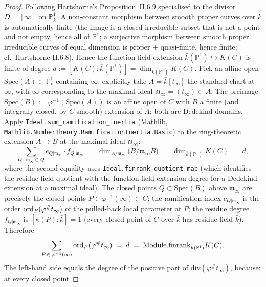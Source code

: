 \begin{proof}
  Following Hartshorne's Proposition~II.6.9 specialised to the divisor
  \(D = [\infty]\) on \(\mathbb P^1_{\bar k}\). A non-constant morphism
  between smooth proper curves over \(\bar k\) is automatically finite (the
  image is a closed irreducible subset that is not a point and not empty,
  hence all of \(\mathbb P^1\); a surjective morphism between smooth proper
  irreducible curves of equal dimension is proper + quasi-finite, hence
  finite; cf.\ Hartshorne II.6.8). Hence the function-field extension
  \(\bar k(\mathbb P^1) \hookrightarrow K(C)\) is finite of degree
  \(d := [K(C) : \bar k(\mathbb P^1)] = \dim_{\bar k(\mathbb P^1)} K(C)\).
  Pick an affine open \(\mathrm{Spec}(A) \subset \mathbb P^1_{\bar k}\) containing
  \(\infty\); explicitly take \(A = \bar k[t_\infty]\) the standard chart at
  \(\infty\), with \(\infty\) corresponding to the maximal ideal
  \(\mathfrak m_\infty = (t_\infty) \subset A\). The preimage
  \(\mathrm{Spec}(B) := \varphi^{-1}(\mathrm{Spec}(A))\) is an affine open of \(C\)
  with \(B\) a finite (and integrally closed, by \(C\) smooth) extension of
  \(A\); both are Dedekind domains. Apply
  \texttt{Ideal.sum\_ramification\_inertia} (Mathlib,
  \texttt{Mathlib.NumberTheory.RamificationInertia.Basic}) to the
  ring-theoretic extension \(A \to B\) at the maximal ideal
  \(\mathfrak m_\infty\):
  \[
    \sum_{Q \,\colon\, \mathfrak m_\infty \subset Q} e_{Q | \mathfrak m_\infty} \cdot f_{Q | \mathfrak m_\infty}
    \;=\; \dim_{A / \mathfrak m_\infty}\!\bigl(B / \mathfrak m_\infty B\bigr)
    \;=\; \dim_{\bar k(\mathbb P^1)} K(C) \;=\; d,
  \]
  where the second equality uses
  \texttt{Ideal.finrank\_quotient\_map} (which identifies the residue-field
  quotient with the function-field extension degree for a Dedekind extension
  at a maximal ideal). The closed points \(Q \subset \mathrm{Spec}(B)\) above
  \(\mathfrak m_\infty\) are precisely the closed points
  \(P \in \varphi^{-1}(\infty) \subset C\); the ramification index
  \(e_{Q | \mathfrak m_\infty}\) is the order \(\operatorname{ord}_P(\varphi^{\#} t_\infty)\)
  of the pulled-back local parameter at \(P\); the residue degree
  \(f_{Q | \mathfrak m_\infty}\) is \([\kappa(P) : \bar k] = 1\) (every closed
  point of \(C\) over \(\bar k\) has residue field \(\bar k\)). Therefore
  \[
    \sum_{P \,\in\, \varphi^{-1}(\infty)} \operatorname{ord}_P(\varphi^{\#} t_\infty) \;=\; d
    \;=\; \mathrm{Module.finrank}_{\bar k(\mathbb P^1)} K(C).
  \]
  The left-hand side equals the degree of the positive part of
  \(\mathrm{div}(\varphi^{\#} t_\infty)\), because: at every closed point

\end{proof}
